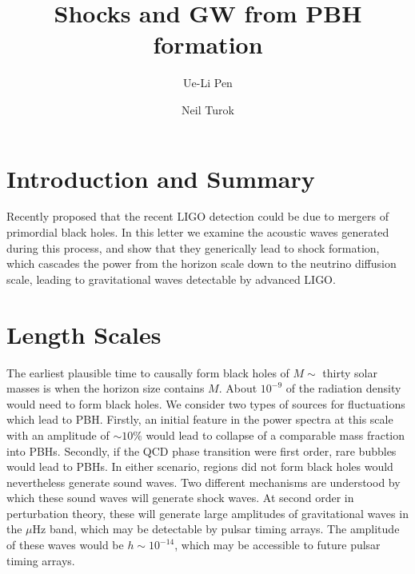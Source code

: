 \documentclass[aps,showpacs,twocolumn,floats,prd,superscriptaddress,nofootinbib]{revtex4}
\begin{document}
\title{Shocks and GW from PBH formation}


\author{Ue-Li Pen}

\author{Neil Turok}

\begin{abstract}

\end{abstract}

\maketitle

\section{Introduction and Summary}

Recently \citet{2016arXiv160300464B} proposed that the recent LIGO
detection\cite{2016PhRvL.116f1102A} could be due to mergers of
primordial black holes.  In this letter we examine the acoustic waves
generated during this process, and show that they generically lead to
shock formation, which cascades the power from the horizon scale down
to the neutrino diffusion scale, leading to gravitational waves
detectable by advanced LIGO.

\section{Length Scales}

The earliest plausible time to causally form black holes of $M\sim$
thirty solar masses is when the horizon size contains $M$.  About
$10^{-9}$ of the radiation density would need to form black holes.  We
consider two types of sources for fluctuations which lead to PBH.
Firstly, an initial feature in the power spectra at this scale with an
amplitude of $\sim 10\%$ would lead to collapse of a comparable mass
fraction into PBHs.  Secondly, if the QCD phase transition were first
order, rare bubbles would lead to PBHs.  In either scenario, regions
did not form black holes would nevertheless generate sound waves.  Two
different mechanisms are understood by which these sound waves will
generate shock waves.  At second order in perturbation theory, these
will generate large amplitudes of gravitational waves in the $\mu$Hz
band\cite{2007PhRvD..76h4019B}, which may be detectable by pulsar
timing arrays.  The amplitude of these waves would be
$h \sim 10^{-14}$, which may be accessible to future pulsar timing
arrays\cite{kramer04}.
\end{document}

